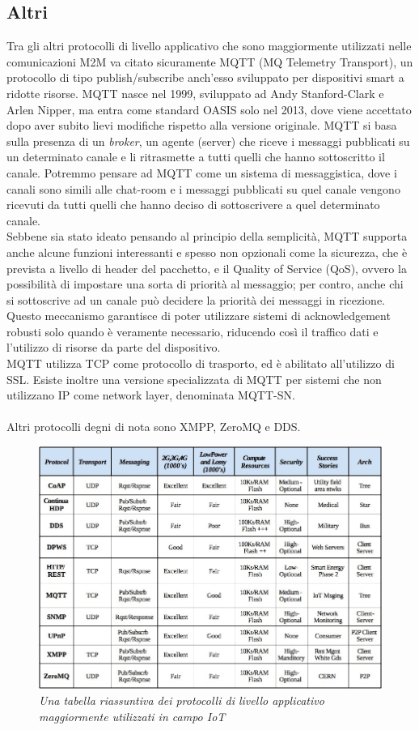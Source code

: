 \subsection{Altri}
Tra gli altri protocolli di livello applicativo che sono maggiormente utilizzati nelle comunicazioni M2M va citato sicuramente MQTT (MQ Telemetry Transport), un protocollo di tipo publish/subscribe anch'esso sviluppato per dispositivi smart a ridotte risorse. MQTT nasce nel 1999, sviluppato ad Andy Stanford-Clark e Arlen Nipper, ma entra come standard OASIS solo nel 2013, dove viene accettato dopo aver subito lievi modifiche rispetto alla versione originale. MQTT si basa sulla presenza di un \textit{broker}, un agente (server) che riceve i messaggi pubblicati su un determinato canale e li ritrasmette a tutti quelli che hanno sottoscritto il canale. Potremmo pensare ad MQTT come un sistema di messaggistica, dove i canali sono simili alle chat-room e i messaggi pubblicati su quel canale vengono ricevuti da tutti quelli che hanno deciso di sottoscrivere a quel determinato canale.
\\Sebbene sia stato ideato pensando al principio della semplicità, MQTT supporta anche alcune funzioni interessanti e spesso non opzionali come la sicurezza, che è prevista a livello di header del pacchetto, e il Quality of Service (QoS), ovvero la possibilità di impostare una sorta di priorità al messaggio; per contro, anche chi si sottoscrive ad un canale può decidere la priorità dei messaggi in ricezione. Questo meccanismo garantisce di poter utilizzare sistemi di acknowledgement robusti solo quando è veramente necessario, riducendo così il traffico dati e l'utilizzo di risorse da parte del dispositivo.
\\MQTT utilizza TCP come protocollo di trasporto, ed è abilitato all'utilizzo di SSL. Esiste inoltre una versione specializzata di MQTT per sistemi che non utilizzano IP come network layer, denominata MQTT-SN.
\\\\Altri protocolli degni di nota sono XMPP, ZeroMQ e DDS.
\begin{figure}[!h]
\centering
\includegraphics[width=\textwidth]{immagini/application-protocols.jpeg}
\caption{\textit{Una tabella riassuntiva dei protocolli di livello applicativo maggiormente utilizzati in campo IoT}}
\end{figure}

